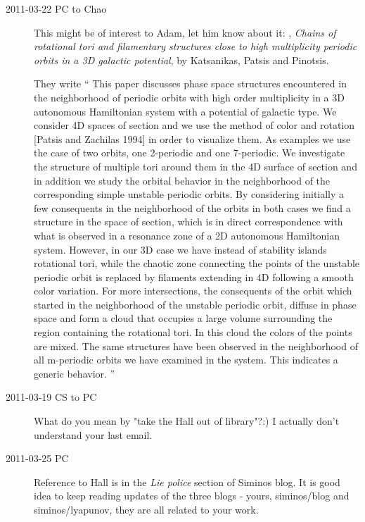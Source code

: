 \begin{description}
\item[2011-03-22 PC to Chao]
This might be of interest to Adam, let him know about it:
,
\emph{Chains of rotational tori and filamentary structures close to high
 multiplicity periodic orbits in a 3D galactic potential},
 by Katsanikas, Patsis and Pinotsis.

They write
``
This paper discusses phase space structures encountered in the neighborhood of periodic orbits with high order multiplicity in a 3D autonomous Hamiltonian system with a potential of galactic type. We consider 4D spaces of section and we use the method of color and rotation [Patsis and Zachilas 1994] in order to visualize them. As examples we use the case of two orbits, one 2-periodic and one 7-periodic. We investigate the structure of multiple tori around them in the 4D surface of section and in addition we study the orbital behavior in the neighborhood of the corresponding simple unstable periodic orbits. By considering initially a few consequents in the neighborhood of the orbits in both cases we find a structure in the space of section, which is in direct correspondence with what is observed in a resonance zone of a 2D autonomous Hamiltonian system. However, in our 3D case we have instead of stability islands rotational tori, while the chaotic zone connecting the points of the unstable periodic orbit is replaced by filaments extending in 4D following a smooth color variation. For more intersections, the consequents of the orbit which started in the neighborhood of the unstable periodic orbit, diffuse in phase space and form a cloud that occupies a large volume surrounding the region containing the rotational tori. In this cloud the colors of the points are mixed. The same structures have been observed in the neighborhood of all m-periodic orbits we have examined in the system. This indicates a generic behavior.
''

\item[2011-03-19 CS to PC]
What do you mean by "take the Hall out of library"?:) I actually don't understand your last email.

\item[2011-03-25 PC]
Reference to Hall is in the {\em Lie police} section of Siminos
blog. It is good idea to keep reading updates of the three blogs - yours,
siminos/blog and siminos/lyapunov, they are all related to your work.

\end{description}
